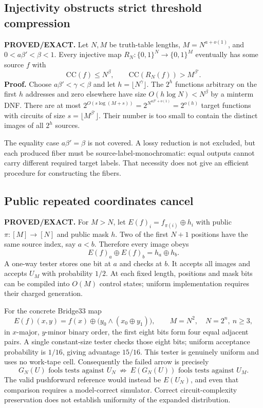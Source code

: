 \documentclass[11pt]{article}
\begin{document}
\subsection{Injectivity obstructs strict threshold compression}

\textbf{PROVED/EXACT.}
Let $N,M$ be truth-table lengths, $M=N^{a+o(1)}$, and
$0<a\beta'<\beta<1$. Every injective map
$R_N:\{0,1\}^N\to\{0,1\}^M$ eventually has some source $f$ with
\[
 \mathrm{CC}(f)\leq N^\beta,
 \qquad \mathrm{CC}(R_N(f))>M^{\beta'}.
\]
\textbf{Proof.} Choose $a\beta'<\gamma<\beta$ and let
$h=\lfloor N^\gamma\rfloor$. The $2^h$ functions arbitrary on the first
$h$ addresses and zero elsewhere have size $O(h\log N)<N^\beta$ by a
minterm DNF. There are at most
$2^{O(s\log(M+s))}=2^{N^{a\beta'+o(1)}}=2^{o(h)}$ target functions with
circuits of size $s=\lfloor M^{\beta'}\rfloor$. Their number is too small
to contain the distinct images of all $2^h$ sources.

The equality case $a\beta'=\beta$ is not covered. A lossy reduction is not
excluded, but each produced fiber must be source-label-monochromatic:
equal outputs cannot carry different required target labels. That necessity
does not give an efficient procedure for constructing the fibers.

\subsection{Public repeated coordinates cancel}

\textbf{PROVED/EXACT.}
For $M>N$, let $E(f)_i=f_{\pi(i)}\oplus h_i$ with public
$\pi:[M]\to[N]$ and public mask $h$. Two of the first $N+1$ positions
have the same source index, say $a<b$. Therefore every image obeys
\[
 E(f)_a\oplus E(f)_b=h_a\oplus h_b.
\]
A one-way tester stores one bit at $a$ and checks at $b$. It accepts all
images and accepts $U_M$ with probability $1/2$. At each fixed length,
positions and mask bits can be compiled into $O(M)$ control states;
uniform implementation requires their charged generation.

For the concrete Bridge33 map
\[
 E(f)(x,y)=f(x)\oplus\bigl(y_0\wedge(x_0\oplus y_1)\bigr),
 \qquad M=N^2,\quad N=2^n,\ n\geq3,
\]
in $x$-major, $y$-minor binary order, the first eight bits form four equal
adjacent pairs. A single constant-size tester checks those eight bits;
uniform acceptance probability is $1/16$, giving advantage $15/16$.
This tester is genuinely uniform and uses no work-tape cell.
Consequently the failed arrow is precisely
\[
 G_N(U)\text{ fools tests against }U_N
 \ \not\Longrightarrow\ 
 E(G_N(U))\text{ fools tests against }U_M.
\]
The valid pushforward reference would instead be $E(U_N)$, and even that
comparison requires a model-correct simulator. Correct circuit-complexity
preservation does not establish uniformity of the expanded distribution.
\end{document}
